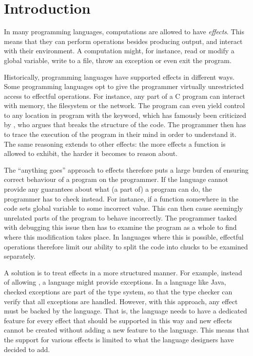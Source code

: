\chapter{Introduction}\label{chap:introduction}

In many programming languages, computations are allowed to have \emph{effects}. This means that they can perform operations besides producing output, and interact with their environment. A computation might, for instance, read or modify a global variable, write to a file, throw an exception or even exit the program.

Historically, programming languages have supported effects in different ways. Some programming languages opt to give the programmer virtually unrestricted access to effectful operations. For instance, any part of a C program can interact with memory, the filesystem or the network. The program can even yield control to any location in program with the  keyword, which has famously been criticized by \textcite{dijkstra_letters_1968}, who argues that  breaks the structure of the code. The programmer then has to trace the execution of the program in their mind in order to understand it. The same reasoning extends to other effects: the more effects a function is allowed to exhibit, the harder it becomes to reason about.

The ``anything goes'' approach to effects therefore puts a large burden of ensuring correct behaviour of a program on the programmer. If the language cannot provide any guarantees about what (a part of) a program can do, the programmer has to check instead. For instance, if a function somewhere in the code sets global variable to some incorrect value. This can then cause seemingly unrelated parts of the program to behave incorrectly. The programmer tasked with debugging this issue then has to examine the program as a whole to find where this modification takes place. In languages where this is possible, effectful operations therefore limit our ability to split the code into chucks to be examined separately.

A solution is to treat effects in a more structured manner. For example, instead of allowing , a language might provide exceptions. In a language like Java, checked exceptions are part of the type system, so that the type checker can verify that all exceptions are handled. However, with this approach, any effect must be backed by the language. That is, the language needs to have a dedicated feature for every effect that should be supported in this way and new effects cannot be created without adding a new feature to the language. This means that the support for various effects is limited to what the language designers have decided to add.

